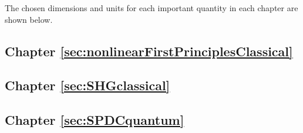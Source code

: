 \documentclass{article}
\begin{document}
The chosen dimensions and units for each important quantity in each chapter are shown below.

\subsection{Chapter \ref{sec:nonlinearFirstPrinciplesClassical}}

\subsection{Chapter \ref{sec:SHGclassical}}

\subsection{Chapter \ref{sec:SPDCquantum}}
\end{document}
